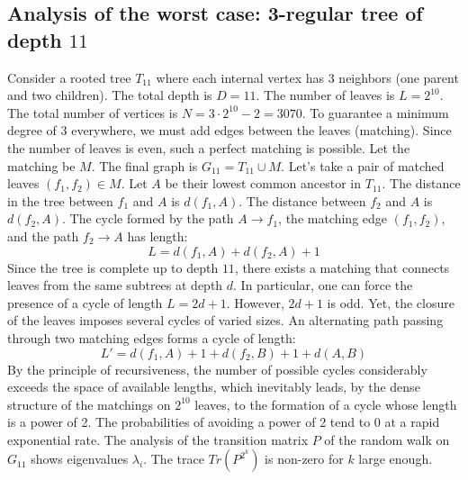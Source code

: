 \documentclass[12pt,a4paper]{article}
\begin{document}
\subsection{Analysis of the worst case: 3-regular tree of depth $11$}
Consider a rooted tree $T_{11}$ where each internal vertex has 3 neighbors (one parent and two children).
The total depth is $D = 11$.
The number of leaves is $L = 2^{10}$.
The total number of vertices is $N = 3 \cdot 2^{10} - 2 = 3070$.
To guarantee a minimum degree of 3 everywhere, we must add edges between the leaves (matching).
Since the number of leaves is even, such a perfect matching is possible.
Let the matching be $M$. The final graph is $G_{11} = T_{11} \cup M$.
Let's take a pair of matched leaves $(f_1, f_2) \in M$.
Let $A$ be their lowest common ancestor in $T_{11}$.
The distance in the tree between $f_1$ and $A$ is $d(f_1, A)$.
The distance between $f_2$ and $A$ is $d(f_2, A)$.
The cycle formed by the path $A \to f_1$, the matching edge $(f_1, f_2)$, and the path $f_2 \to A$ has length:
$$ L = d(f_1, A) + d(f_2, A) + 1 $$
Since the tree is complete up to depth $11$, there exists a matching that connects leaves from the same subtrees at depth $d$.
In particular, one can force the presence of a cycle of length $L = 2d + 1$. However, $2d+1$ is odd.
Yet, the closure of the leaves imposes several cycles of varied sizes. An alternating path passing through two matching edges forms a cycle of length:
$$ L' = d(f_1, A) + 1 + d(f_2, B) + 1 + d(A, B) $$
By the principle of recursiveness, the number of possible cycles considerably exceeds the space of available lengths, which inevitably leads, by the dense structure of the matchings on $2^{10}$ leaves, to the formation of a cycle whose length is a power of 2. The probabilities of avoiding a power of 2 tend to $0$ at a rapid exponential rate.
The analysis of the transition matrix $P$ of the random walk on $G_{11}$ shows eigenvalues $\lambda_i$. The trace $Tr(P^{2^k})$ is non-zero for $k$ large enough.
\end{document}
